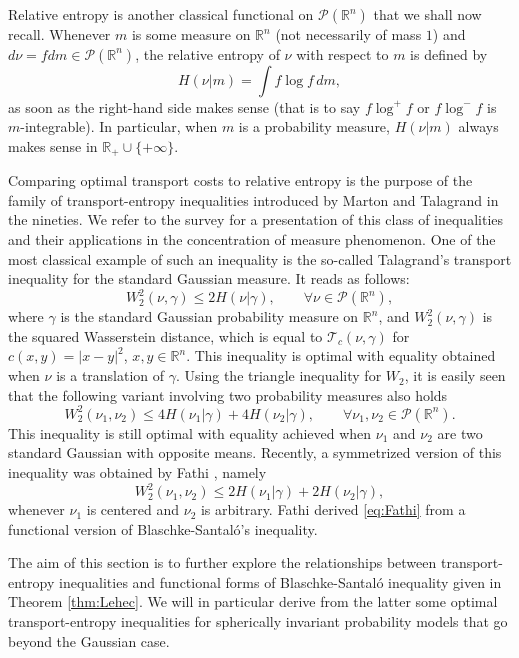 \documentclass[10pt]{amsart}
\theoremstyle{definition}
\theoremstyle{remark}
\newcommand{\R}{\mathbb{R}}
\begin{document}
Relative entropy is another classical functional on $\mathcal{P}(\R^n)$ that we shall now recall. Whenever $m$ is some measure on $\R^n$ (not necessarily of mass $1$) and $d\nu = f dm \in \mathcal{P}(\R^n)$, the relative entropy of $\nu$ with respect to $m$ is defined by 
\[
H(\nu|m)=\int f\log f\,dm,
\]
as soon as the right-hand side makes sense (that is to say $f \log^+ f$ or $f \log^- f$ is $m$-integrable). In particular, when $m$ is a probability measure, $H(\nu|m)$ always makes sense in $\R_+ \cup\{+\infty\}$.

Comparing optimal transport costs to relative entropy is the purpose of the family of transport-entropy inequalities introduced by Marton \cite{Mar86,Mar96a,Mar96b} and Talagrand \cite{Tal96} in the nineties. We refer to the survey \cite{GL10} for a presentation of this class of inequalities and their applications in the concentration of measure phenomenon. One of the most classical example of such an inequality is the so-called Talagrand's transport inequality for the standard Gaussian measure. It reads as follows:
\[ 
W_2^2(\nu,\gamma) \le 2H(\nu|\gamma),\qquad \forall \nu \in \mathcal{P}(\R^n),
\]
where $\gamma$ is the standard Gaussian probability measure on $\R^n$, and $W_2^2(\nu,\gamma)$ is the squared Wasserstein distance, which is equal to $\mathcal{T}_c(\nu,\gamma)$ for $c(x,y)=|x-y|^2$, $x,y\in \R^n$. This inequality is optimal with equality obtained when $\nu$ is a translation of $\gamma.$
Using the triangle inequality for $W_2$, it is easily seen that the following variant involving two probability measures also holds
\[ W_2^2(\nu_1,\nu_2) \le 4H(\nu_1|\gamma)  +4H(\nu_2|\gamma),\qquad \forall \nu_1,\nu_2 \in \mathcal{P}(\R^n).\]
This inequality is still optimal with equality achieved when $\nu_1$ and $\nu_2$ are two standard Gaussian with opposite means.
Recently, a symmetrized version of this inequality was obtained by Fathi \cite{fat18}, namely 
\begin{equation}\label{eq:Fathi} W_2^2(\nu_1,\nu_2) \le 2H(\nu_1|\gamma)  +2H(\nu_2|\gamma),
\end{equation}
whenever $\nu_1$ is centered and $\nu_2$ is arbitrary. 
Fathi derived \eqref{eq:Fathi} from a functional version of Blaschke-Santal\'o's inequality.

The aim of this section is to further explore the relationships between transport-entropy inequalities and functional forms of Blaschke-Santal\'o inequality given in Theorem \ref{thm:Lehec}. We will in particular derive from the latter some optimal transport-entropy inequalities for spherically invariant probability models that go beyond the Gaussian case. 
\end{document}
